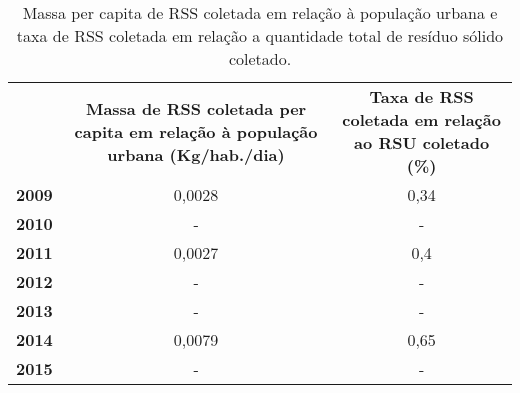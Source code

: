 \begin{table}[htbp]
  \centering
  \caption{Massa per capita de RSS coletada em relação à população urbana e taxa de RSS coletada em relação a quantidade total de resíduo sólido coletado.}
    \begin{tabular}{c|c|c}
    \rowcolor[rgb]{ .969,  .588,  .275} \multicolumn{1}{P{5em}}{\textcolor[rgb]{ 1,  1,  1}{\textbf{Ano}}} & \multicolumn{1}{P{10em}|}{\textcolor[rgb]{ 1,  1,  1}{\textbf{Massa de RSS coletada per capita em relação à população urbana (Kg/hab./dia)}}} & \multicolumn{1}{P{8.355em}}{\textcolor[rgb]{ 1,  1,  1}{\textbf{Taxa de RSS coletada em relação ao RSU coletado (\%)}}} \\
    \rowcolor[rgb]{ .984,  .831,  .706} \textbf{2009} & 0,0028 & 0,34 \\
    \rowcolor[rgb]{ .992,  .914,  .851} \textbf{2010} & -     & - \\
    \rowcolor[rgb]{ .984,  .831,  .706} \textbf{2011} & 0,0027 & 0,4 \\
    \rowcolor[rgb]{ .992,  .914,  .851} \textbf{2012} & -     & - \\
    \rowcolor[rgb]{ .984,  .831,  .706} \textbf{2013} & -     & - \\
    \rowcolor[rgb]{ .992,  .914,  .851} \textbf{2014} & 0,0079 & 0,65 \\
    \rowcolor[rgb]{ .984,  .831,  .706} \textbf{2015} & -     & - \\
    \end{tabular}%
  \label{tab:massa_rss}%
\end{table}%
